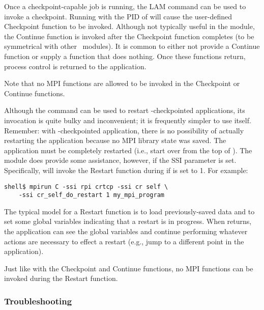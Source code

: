 Once a checkpoint-capable job is running, the LAM command
 can be used to invoke a checkpoint.  Running
 with the PID of  will cause the
user-defined Checkpoint function to be invoked.  Although not
typically useful in the  module, the Continue function is
invoked after the Checkpoint function completes (to be symmetrical
with other \crssi\ modules).  It is common to either not provide a
Continue function or supply a function that does nothing.  Once these
functions return, process control is returned to the application.

Note that no MPI functions are allowed to be invoked in the Checkpoint
or Continue functions.

Although the  command can be used to restart
-checkpointed applications, its invocation is quite bulky
and inconvenient; it is frequently simpler to use  itself.
Remember: with -checkpointed application, there is no
possibility of actually restarting the application because no MPI
library state was saved.  The application must be completely restarted
(i.e., start over from the top of ).  The 
module does provide some assistance, however, if the
 SSI parameter is set.
Specifically,  will invoke the Restart function during
 if  is set
to 1.  For example:

\lstset{style=lam-cmdline}
\begin{lstlisting}
shell$ mpirun C -ssi rpi crtcp -ssi cr self \
    -ssi cr_self_do_restart 1 my_mpi_program
\end{lstlisting}

The typical model for a Restart function is to load previously-saved
data and to set some global variables indicating that a restart is in
progress.  When \mpifunc{MPI\_\-INIT} returns, the application can see
the global variables and continue performing whatever actions are
necessary to effect a restart (e.g., jump to a different point in the
application).

Just like with the Checkpoint and Continue functions, no MPI functions
can be invoked during the Restart function.


\subsubsection{Troubleshooting}

